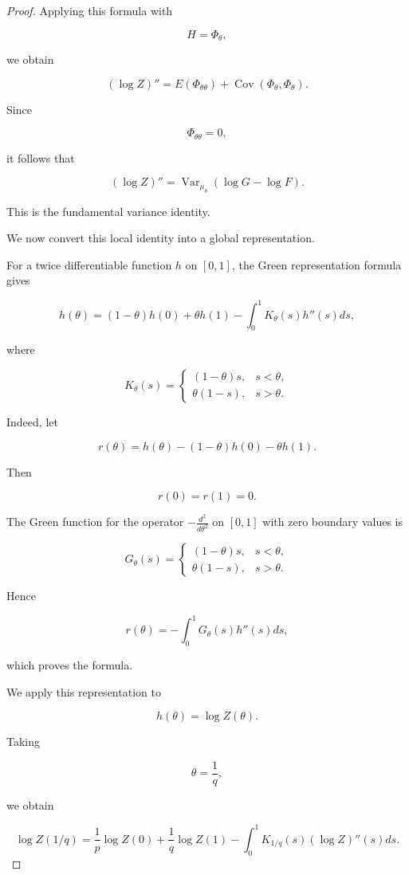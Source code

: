 \documentclass[10pt,a4paper]{amsart}
\begin{document}
\begin{proof}
Applying this formula with

\[
H=\Phi_\theta ,
\]

we obtain

\[
(\log Z)''
=
E(\Phi_{\theta\theta})
+
\operatorname{Cov}
(\Phi_\theta,\Phi_\theta).
\]

Since

\[
\Phi_{\theta\theta}=0 ,
\]

it follows that

\[
\boxed{
(\log Z)''
=
\operatorname{Var}_{\mu_\theta}
(
\log G-\log F
).
}
\]

This is the fundamental variance identity.


We now convert this local identity into a global representation.

For a twice differentiable function $h$ on $[0,1]$,
the Green representation formula gives

\[
h(\theta)
=
(1-\theta)h(0)
+
\theta h(1)
-
\int_0^1
K_\theta(s)h''(s)ds ,
\]

where

\[
K_\theta(s)
=
\begin{cases}
(1-\theta)s,
&
s<\theta ,
\\[1ex]
\theta(1-s),
&
s>\theta .
\end{cases}
\]


Indeed, let

\[
r(\theta)
=
h(\theta)
-
(1-\theta)h(0)
-
\theta h(1).
\]

Then

\[
r(0)=r(1)=0 .
\]

The Green function for the operator
$-\frac{d^2}{d\theta^2}$ on $[0,1]$
with zero boundary values is

\[
G_\theta(s)
=
\begin{cases}
(1-\theta)s,
&
s<\theta ,
\\[1ex]
\theta(1-s),
&
s>\theta .
\end{cases}
\]

Hence

\[
r(\theta)
=
-\int_0^1
G_\theta(s)h''(s)ds ,
\]

which proves the formula.


We apply this representation to

\[
h(\theta)=\log Z(\theta).
\]

Taking

\[
\theta=\frac1q ,
\]

we obtain

\[
\log Z(1/q)
=
\frac1p\log Z(0)
+
\frac1q\log Z(1)
-
\int_0^1
K_{1/q}(s)
(\log Z)''(s)ds .
\]



\end{proof}
\end{document}
